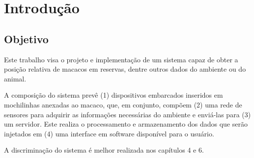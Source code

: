\chapter{Introdução}
	
\section{Objetivo}
Este trabalho visa o projeto e implementação de um sistema capaz de obter a posição relativa de macacos em reservas, dentre outros dados do ambiente ou do animal.

A composição do sistema prevê (1) dispositivos embarcados inseridos em mochilinhas anexadas ao macaco, que, em conjunto, compõem (2) uma rede de sensores para adquirir as informações necessárias do ambiente e enviá-las para (3) um servidor. Este realiza o processamento e armazenamento dos dados que serão injetados em (4) uma interface em software disponível para o usuário.

A discriminação do sistema é melhor realizada nos capítulos 4 e 6.

